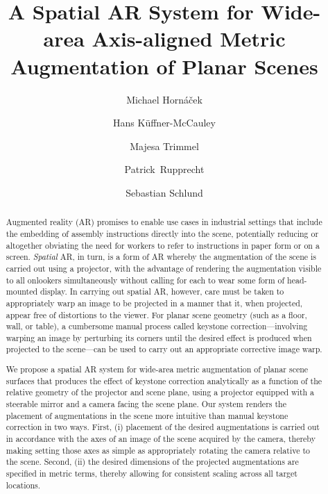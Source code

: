 \documentclass[review]{elsarticle}
\begin{document}
\begin{frontmatter}

\title{A Spatial AR System for Wide-area Axis-aligned Metric Augmentation of Planar Scenes} %

\author{Michael Horn\'{a}\v{c}ek}
\author{Hans K\"{u}ffner-McCauley}
\author{Majesa Trimmel}
\author{Patrick~Rupprecht}
\author{Sebastian Schlund}
\address{Human Centered Cyber Physical Production and Assembly Systems, Institute for Management Sciences, TU Wien, Vienna, Austria}

\begin{abstract}
Augmented reality (AR) promises to enable use cases in industrial settings that include the embedding of assembly instructions directly into the scene, potentially reducing or altogether obviating the need for workers to refer to instructions in paper form or on a screen. \textit{Spatial} AR, in turn, is a form of AR whereby the augmentation of the scene is carried out using a projector, with the advantage of rendering the augmentation visible to all onlookers simultaneously without calling for each to wear some form of head-mounted display. In carrying out spatial AR, however, care must be taken to appropriately warp an image to be projected in a manner that it, when projected, appear free of distortions to the viewer. For planar scene geometry (such as a floor, wall, or table), a cumbersome manual process called keystone correction---involving warping an image by perturbing its corners until the desired effect is produced when projected to the scene---can be used to carry out an appropriate corrective image warp. %

We propose a spatial AR system for wide-area metric augmentation of planar scene surfaces that produces the effect of keystone correction analytically as a function of the relative geometry of the projector and scene plane, using a projector equipped with a steerable mirror and a camera facing the scene plane. Our system renders the placement of augmentations in the scene more intuitive than manual keystone correction in two ways. First, (i) placement of the desired augmentations is carried out in accordance with the axes of an image of the scene acquired by the camera, thereby making setting those axes as simple as appropriately rotating the camera relative to the scene. Second, (ii) the desired dimensions of the projected augmentations are specified in metric terms, thereby allowing for consistent scaling across all target locations. %
\end{abstract}


\end{frontmatter}
\end{document}
